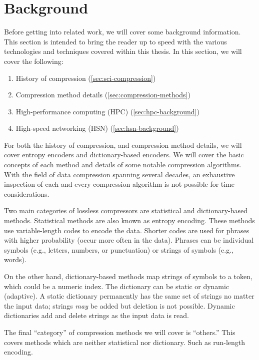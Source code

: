 \chapter{Background}
\label{sec:background}

Before getting into related work, we will cover some background information.
This section is intended to bring the reader up to speed with the various
technologies and techniques covered within this thesis. In this section, we will
cover the following:
\begin{enumerate}
\item History of compression (\cref{sec:sci-compression})
\item Compression method details (\cref{sec:compression-methods})
\item High-performance computing (HPC) (\cref{sec:hpc-background})
\item High-speed networking (HSN) (\cref{sec:hsn-background})
\end{enumerate}
For both the history of compression, and compression method details, we will
cover entropy encoders and dictionary-based encoders. We will cover the basic
concepts of each method and details of some notable compression algorithms. With
the field of data compression spanning several decades, an exhaustive inspection
of each and every compression algorithm is not possible for time considerations.

Two main categories of lossless compressors are statistical and dictionary-based
methods\cite[7]{salomon_data_2004}. Statistical methods are also known as
entropy encoding. These methods use variable-length codes to encode the data.
Shorter codes are used for phrases with higher probability (occur more often in
the data). Phrases can be individual symbols (e.g., letters, numbers, or
punctuation) or strings of symbols (e.g., words)\cite[43]{salomon_data_2004}.

On the other hand, dictionary-based methods map strings of symbols to a token,
which could be a numeric index. The dictionary can be static or dynamic
(adaptive). A static dictionary permanently has the same set of strings no
matter the input data; strings \emph{may} be added but deletion is not possible.
Dynamic dictionaries add and delete strings as the input data is
read\cite[165]{salomon_data_2004}.

The final ``category'' of compression methods we will cover is ``others.'' This
covers methods which are neither statistical nor dictionary. Such as run-length
encoding.

